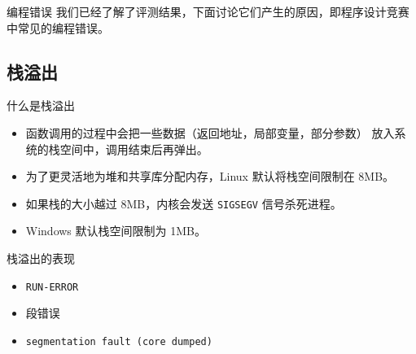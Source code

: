 \documentclass[10pt,mathserif]{beamer}
\begin{document}
\begin{frame}{编程错误}
	我们已经了解了评测结果，下面讨论它们产生的原因，即程序设计竞赛中常见的编程错误。
\end{frame}

\subsection{栈溢出}

\begin{frame}{什么是栈溢出}
	\begin{itemize}
		\item 函数调用的过程中会把一些数据（返回地址，局部变量，部分参数）
			放入系统的栈空间中，调用结束后再弹出。
		\item 为了更灵活地为堆和共享库分配内存，Linux 默认将栈空间限制在 8MB。
		\item 如果栈的大小越过 8MB，内核会发送 \lstinline!SIGSEGV!
			信号杀死进程。
		\item Windows 默认栈空间限制为 1MB。
	\end{itemize}
\end{frame}

\begin{frame}{栈溢出的表现}
	\begin{itemize}
		\item \lstinline{RUN-ERROR}
		\item 段错误
		\item \lstinline{segmentation fault (core dumped)}
	\end{itemize}
\end{frame}
\end{document}
